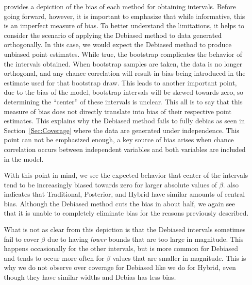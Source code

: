  provides a depiction of the bias of each method for obtaining intervals. Before going forward, however, it is important to emphasize that while informative, this is an imperfect measure of bias. To better understand the limitations, it helps to consider the scenario of applying the Debiased method to data generated orthogonally. In this case, we would expect the Debiased method to produce unbiased point estimates. While true, the bootstrap complicates the behavior of the intervals obtained. When bootstrap samples are taken, the data is no longer orthogonal, and any chance correlation will result in bias being introduced in the estimate used for that bootstrap draw. This leads to another important point, due to the bias of the model, bootstrap intervals will be skewed towards zero, so determining the ``center'' of these intervals is unclear. This all is to say that this measure of bias does not directly translate into bias of their respective point estimates. This explains why the Debiased method fails to fully debias as seen in Section~\ref{Sec:Coverage} where the data are generated under independence. This point can not be emphasized enough, a key source of bias arises when chance correlation occurs between independent variables and both variables are included in the model.

With this point in mind, we see the expected behavior that center of the intervals tend to be increasingly biased towards zero for larger absolute values of $\beta$.  also indicates that Traditional, Posterior, and Hybrid have similar amounts of central bias. Although the Debiased method cuts the bias in about half, we again see that it is unable to completely eliminate bias for the reasons previously described.

What is not as clear from this depiction is that the Debiased intervals sometimes fail to cover $\beta$ due to having \textit{lower} bounds that are too large in magnitude. This happens occasionally for the other intervals, but is more common for Debiased and tends to occur more often for $\beta$ values that are smaller in magnitude. This is why we do not observe over coverage for Debiased like we do for Hybrid, even though they have similar widths and Debias has less bias. 

